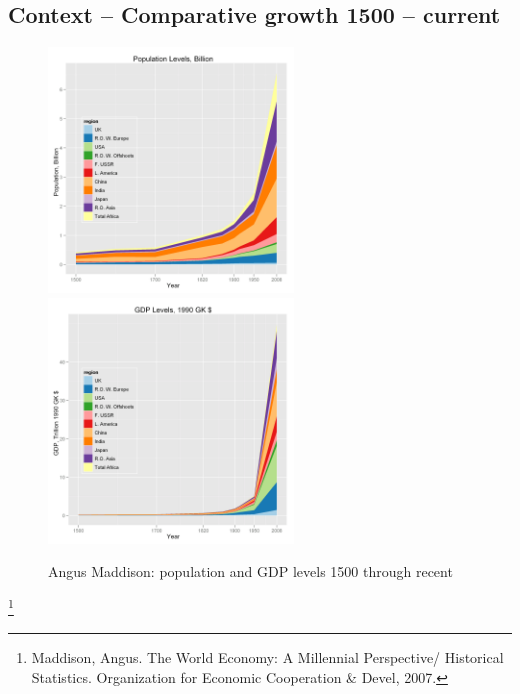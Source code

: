\documentclass[final]{beamer}
\begin{document}
\subsection{Context -- Comparative growth 1500 -- current}
\begin{frame}
		\begin{figure}
		\centerline{
		\mbox{\includegraphics[width=0.58\textwidth]{maddisonregpoplevels.png}}
		\mbox{\includegraphics[width=0.58\textwidth]{maddisonreggdplevels.png}}
		}
		\caption{Angus Maddison: population and GDP levels 1500 through recent}
		\label{fig:poplevel}
		\end{figure}
		\footnote{Maddison, Angus. The World Economy: A Millennial Perspective/ Historical Statistics. Organization for Economic Cooperation \& Devel, 2007.}
\end{frame}
\end{document}
